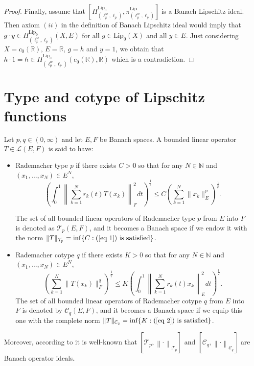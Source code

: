 \documentclass[12pt]{amsart}
\def\C{\mathcal{C}}
\def\L{\mathcal{L}}
\def\R{\mathbb{R}}
\def\T{\mathcal{T}}
\def\C{\mathcal{C}}
\def\N{\mathbb{N}}
\def\Lip{\mathrm{Lip}_0}
\def\Lipnorm{\mathrm{Lip}}
\begin{document}
\begin{proof}
	Finally, assume that $[\Pi_{(\ell_p^w,\ell_p)}^{\Lip},\pi_{(\ell_p^w,\ell_p)}^{\Lipnorm}]$ is a Banach Lipschitz ideal. Then axiom $(ii)$ in the definition of Banach Lipschitz ideal would imply that $g \cdot y \in \Pi_{(\ell_p^w,\ell_p)}^{\Lip}(X,E)$ for all $g \in \Lip(X)$ and all $y \in E$. Just considering $X= c_0(\R)$, $E=\R$, $g=h$ and $y=1$, we obtain that $h \cdot  1 = h \in \Pi_{(\ell_p^w,\ell_p)}^{\Lip}(c_0(\R),\R)$ which is a contradiction.
\end{proof}

\section{Type and cotype of Lipschitz functions}\label{Sec 3}

Let $p,q \in (0,\infty)$ and let $E,F$ be Banach spaces. A bounded linear operator $T\in\L(E,F)$ is said to have:
\begin{itemize}
	\item[$(i)$] Rademacher type $p$ if there exists $C>0$ so that for any $N\in\N$ and $(x_1,\ldots,x_N) \in E^N$,
	\begin{equation}\label{eq 1}
	\left(\int_{0}^{1}\left\| \sum_{k=1}^N r_k(t)T(x_k) \right\|_F^2 dt\right)^{\frac{1}{2}} \leq C \left( \sum_{k=1}^N \|x_k\|_E^p \right)^{\frac{1}{p}}.
	\end{equation}

	The set of all bounded linear operators of Rademacher type $p$ from $E$ into $F$ is denoted as $\T_p(E,F)$, and it becomes a Banach space if we endow it with the norm $\|T\|_{\T_p} = \inf\{C: (\ref{eq 1}) \text{ is satisfied}\}$.
	\item[$(ii)$] Rademacher cotype $q$ if there exists $K>0$ so that for any $N\in\N$ and $(x_1,\ldots,x_N) \in E^N$,
	\begin{equation}\label{eq 2}
	\left(\sum_{k=1}^N \|T(x_k)\|_F^q \right)^{\frac{1}{q}} \leq K \left(\int_{0}^{1}\left\| \sum_{k=1}^{N} r_k(t)x_k \right\|_E^2 dt \right)^{\frac{1}{2}}.
	\end{equation}
	The set of all bounded linear operators of Rademacher cotype $q$ from $E$ into $F$ is denoted by $\C_q(E,F)$, and it becomes a Banach space if we equip this one with the complete norm $\|T\|_{\C_q} = \inf\{K: (\ref{eq 2}) \text{ is satisfied}\}$.
\end{itemize}

Moreover, according to \cite[Chapter 21]{Pie-80} it is well-known that $[\T_p,\left\|\cdot\right\|_{\T_p}]$ and $[\C_q,\left\|\cdot\right\|_{\C_q}]$ are Banach operator ideals.
\end{document}
